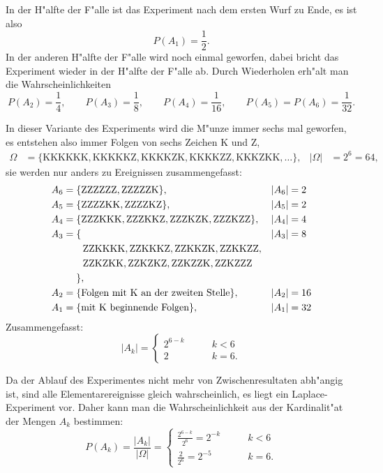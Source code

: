 \begin{loesung}
\begin{teilaufgaben}
In der H"alfte der F"alle ist das Experiment nach dem ersten Wurf zu Ende,
es ist also
\[
P(A_1) = \frac12.
\]
In der anderen H"alfte der F"alle wird noch einmal geworfen, dabei bricht das 
Experiment wieder in der H"alfte der F"alle ab.
Durch Wiederholen erh"alt man die Wahrscheinlichkeiten
\[
P(A_2)=\frac14,\qquad
P(A_3)=\frac18,\qquad
P(A_4)=\frac1{16},\qquad
P(A_5)=P(A_6)=\frac1{32}.
\]
\item
In dieser Variante des Experiments wird die M"unze immer sechs mal geworfen,
es entstehen also immer Folgen von sechs Zeichen K und Z,
\begin{align*}
\Omega&=\{
\text{KKKKKK},
\text{KKKKKZ},
\text{KKKKZK},
\text{KKKKZZ},
\text{KKKZKK},\dots
\},&|\Omega|&=2^6=64,
\end{align*}
sie werden nur anders zu Ereignissen zusammengefasst:
\begin{align*}
A_6&=\{\text{ZZZZZZ}, \text{ZZZZZK}\},&|A_6|&=2\\
A_5&=\{
\text{ZZZZKK},
\text{ZZZZKZ}
\},&|A_5|&=2\\
A_4&=\{
\text{ZZZKKK},
\text{ZZZKKZ},
\text{ZZZKZK},
\text{ZZZKZZ}
\},&|A_4|&=4\\
A_3&=\{
&|A_3|&=8\\
&\qquad
\text{ZZKKKK},
\text{ZZKKKZ},
\text{ZZKKZK},
\text{ZZKKZZ},\\
&\qquad\text{ZZKZKK},
\text{ZZKZKZ},
\text{ZZKZZK},
\text{ZZKZZZ}\\
&\phantom{\mathstrut=\mathstrut }\},\\
A_2&=\{\text{Folgen mit K an der zweiten Stelle}\},&|A_2|&=16\\
A_1&=\{\text{mit K beginnende Folgen}\},&|A_1|&=32\\
\end{align*}
Zusammengefasst:
\[
|A_k|=\begin{cases}
2^{6-k}&\qquad k<6\\
2&\qquad k=6.
\end{cases}
\]
\item
Da der Ablauf des Experimentes nicht mehr von Zwischenresultaten abh"angig ist,
sind alle Elementarereignisse gleich wahrscheinlich, es liegt ein Laplace-Experiment
vor.
Daher kann man die Wahrscheinlichkeit aus der Kardinalit"at der Mengen $A_k$
bestimmen:
\[
P(A_k)=\frac{|A_k|}{|\Omega|}
=\begin{cases}
\frac{2^{6-k}}{2^6}=2^{-k}&\qquad k<6\\
\frac{2}{2^6}=2^{-5}&\qquad k=6.
\end{cases}
\]
\item

\end{teilaufgaben}
\end{loesung}
